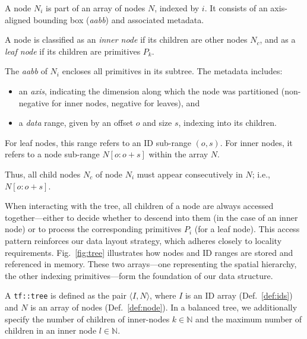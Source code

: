 \begin{definition}[Node]\label{def:node}
	A node $N_i$ is part of an array of nodes $N$,
	indexed by $i$. It consists of an axis-aligned bounding box
	(\emph{aabb}) and associated metadata.

	A node is classified as an \emph{inner node} if its
	children are other nodes $N_c$, and as a \emph{leaf node}
	if its children are primitives $P_k$.

	The \emph{aabb} of $N_i$ encloses all primitives in its
	subtree. The metadata includes:
	\begin{itemize}
		\item an \emph{axis}, indicating the dimension along
		      which the node was partitioned (non-negative for
		      inner nodes, negative for leaves), and
		\item a \emph{data} range, given by an offset $o$ and
		      size $s$, indexing into its children.
	\end{itemize}

	For leaf nodes, this range refers to an ID sub-range
	$(o, s)$. For inner nodes, it refers to a node sub-range
	$N[o : o + s]$ within the array $N$.

	Thus, all child nodes $N_c$ of node $N_i$ must appear
	consecutively in $N$; i.e., $N[o : o + s]$.
\end{definition}



When interacting with the tree, all children of a node
are always accessed together—either to decide whether
to descend into them (in the case of an inner node)
or to process the corresponding primitives $P_i$
(for a leaf node). This access pattern reinforces our
data layout strategy, which adheres closely to locality
requirements.
Fig.~\ref{fig:tree} illustrates how nodes and ID ranges
are stored and referenced in memory. These two arrays—one
representing the spatial hierarchy, the other indexing
primitives—form the foundation of our data structure.

\begin{definition}[tf::tree]\label{def:tree}
	A \texttt{tf::tree} is defined as the pair $\langle I, N \rangle$,
	where $I$ is an ID array (Def.~\ref{def:ids}) and $N$ is an array
	of nodes (Def.~\ref{def:node}). In a balanced tree, we
	additionally specify the number of children of inner-nodes
	$k\in\mathbb{N}$ and the maximum number of children in an
	inner node $l\in\mathbb{N}$.
\end{definition}

